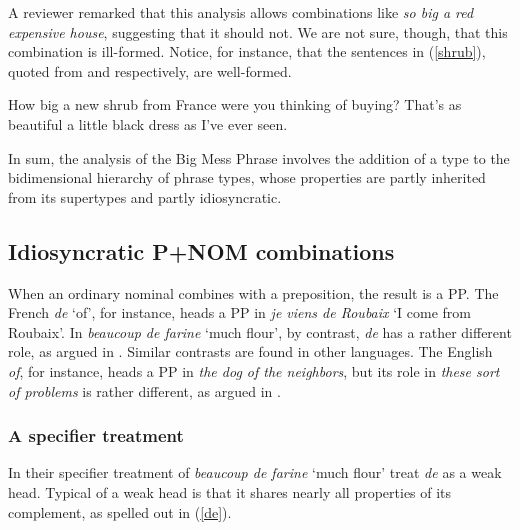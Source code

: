 \documentclass[output=paper
                ,modfonts
                ,nonflat
	        ,collection
	        ,collectionchapter
	        ,collectiontoclongg
 	        ,biblatex
                ,babelshorthands
                ,newtxmath
                ,draftmode
                ,colorlinks, citecolor=brown
]{./langsci/langscibook}
\begin{document}
A reviewer remarked that this analysis allows combinations like 
\emph{so big a red expensive house}, suggesting that it should not. 
We are not sure, though, that this combination is ill-formed.
Notice, for instance, that the sentences in (\ref{shrub}), 
quoted from \citet[116]{Zwicky95} and \citet[42]{Troseth09} respectively, 
are well-formed. 

\begin{exe} 
\ex\label{shrub} 
\begin{xlist} 
\ex  How big a new shrub from France were you thinking of buying? 
\ex  That's as beautiful a little black dress as I've ever seen.  
\end{xlist} 
\end{exe} 

In sum, the analysis of the Big Mess Phrase involves the addition of 
a type to the bidimensional hierarchy of phrase types, whose properties 
are partly inherited from its supertypes and partly idiosyncratic.      


\subsection{Idiosyncratic P+NOM combinations} 
\label{prep}


When an ordinary nominal combines with a preposition, the result is a PP. 
The French \emph{de} `of', for instance, heads a PP in 
\emph{je viens de Roubaix} `I come from Roubaix'. 
In \emph{beaucoup de farine} `much flour', by contrast, \emph{de} has 
a rather different role, as argued in \citet{Abeilleetal04}. 
Similar contrasts are found in other languages. The English \emph{of}, for instance, 
heads a PP in \emph{the dog of the neighbors}, but its role in \emph{these sort of problems} 
is rather different, as argued in \citet{Maekawa15}.  


\subsubsection{A specifier treatment} 


In their specifier treatment of \emph{beaucoup de farine} `much flour'  
\citet{Abeilleetal04} treat \emph{de} as a weak head. 
Typical of a weak head is that it shares 
nearly all properties of its complement, as spelled out in (\ref{de}).
\end{document}
